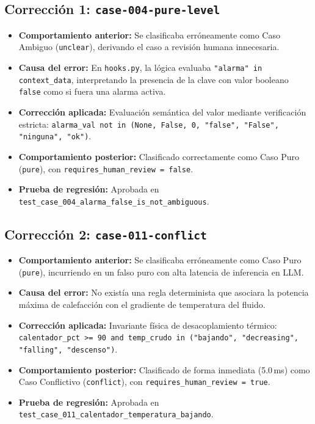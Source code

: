 \documentclass[11pt,a4paper]{article}
\begin{document}
\subsection{Corrección 1: \texttt{case-004-pure-level}}
\begin{itemize}[leftmargin=*]
    \item \textbf{Comportamiento anterior:} Se clasificaba erróneamente como Caso Ambiguo (\texttt{unclear}), derivando el caso a revisión humana innecesaria.
    \item \textbf{Causa del error:} En \texttt{hooks.py}, la lógica evaluaba \texttt{"alarma" in context\_data}, interpretando la presencia de la clave con valor booleano \texttt{false} como si fuera una alarma activa.
    \item \textbf{Corrección aplicada:} Evaluación semántica del valor mediante verificación estricta: \texttt{alarma\_val not in (None, False, 0, "false", "False", "ninguna", "ok")}.
    \item \textbf{Comportamiento posterior:} Clasificado correctamente como Caso Puro (\texttt{pure}), con \texttt{requires\_human\_review = false}.
    \item \textbf{Prueba de regresión:} Aprobada en \texttt{test\_case\_004\_alarma\_false\_is\_not\_ambiguous}.
\end{itemize}

\subsection{Corrección 2: \texttt{case-011-conflict}}
\begin{itemize}[leftmargin=*]
    \item \textbf{Comportamiento anterior:} Se clasificaba erróneamente como Caso Puro (\texttt{pure}), incurriendo en un falso puro con alta latencia de inferencia en LLM.
    \item \textbf{Causa del error:} No existía una regla determinista que asociara la potencia máxima de calefacción con el gradiente de temperatura del fluido.
    \item \textbf{Corrección aplicada:} Invariante física de desacoplamiento térmico: \texttt{calentador\_pct >= 90 and temp\_crudo in ("bajando", "decreasing", "falling", "descenso")}.
    \item \textbf{Comportamiento posterior:} Clasificado de forma inmediata (5.0\,ms) como Caso Conflictivo (\texttt{conflict}), con \texttt{requires\_human\_review = true}.
    \item \textbf{Prueba de regresión:} Aprobada en \texttt{test\_case\_011\_calentador\_temperatura\_bajando}.
\end{itemize}
\end{document}
